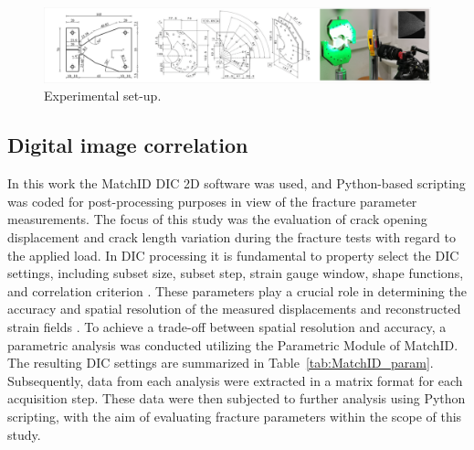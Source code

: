 \documentclass[3p,times,procedia]{elsarticle}
\begin{document}

\begin{figure}[htbp]
	\centering
	\includegraphics[width=\textwidth]{Fig1}
	\begin{minipage}{0.3\textwidth}
	\hspace{1cm}\hspace{1cm}
	\end{minipage}
	\caption{Experimental set-up.}
	\label{F:Fig1}
\end{figure}

\subsection{Digital image correlation}\label{Ss:dic}

In this work the MatchID DIC 2D software was used, and Python-based scripting was coded for post-processing purposes in view of the fracture parameter measurements. The focus of this study was the evaluation of crack opening displacement and crack length variation during the fracture tests with regard to the applied load. In DIC processing it is fundamental to property select the DIC settings, including subset size, subset step, strain gauge window, shape functions, and correlation criterion \citep{DICguide2018}. These parameters play a crucial role in determining the accuracy and spatial resolution of the measured displacements and reconstructed strain fields \citep{Xavier2012207,PereiraandXavier2018}. To achieve a trade-off between spatial resolution and accuracy, a parametric analysis was conducted utilizing the Parametric Module of MatchID. The resulting DIC settings are summarized in Table~\ref{tab:MatchID_param}. Subsequently, data from each analysis were extracted in a matrix format for each acquisition step. These data were then subjected to further analysis using Python scripting, with the aim of evaluating fracture parameters within the scope of this study.
\end{document}
